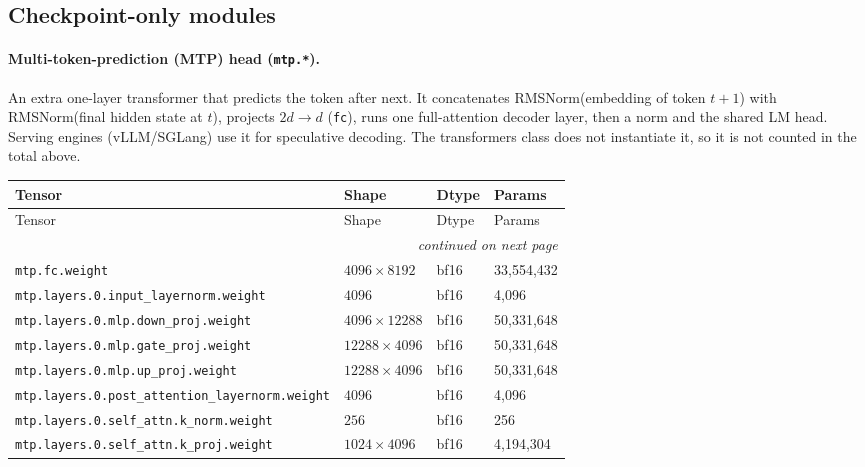 \documentclass[10pt,a4paper]{article}
\theoremstyle{definition}
\begin{document}
\subsection{Checkpoint-only modules}
\paragraph{Multi-token-prediction (MTP) head (\texttt{mtp.*}).} An extra one-layer transformer that predicts the token after next. It concatenates RMSNorm(embedding of token $t{+}1$) with RMSNorm(final hidden state at $t$), projects $2d\to d$ (\texttt{fc}), runs one full-attention decoder layer, then a norm and the shared LM head. Serving engines (vLLM/SGLang) use it for speculative decoding. The transformers class does not instantiate it, so it is not counted in the total above.
\begin{longtable}{p{8.5cm}lll}
\toprule
Tensor & Shape & Dtype & Params \\
\midrule
\endfirsthead
\toprule
Tensor & Shape & Dtype & Params \\
\midrule
\endhead
\midrule \multicolumn{4}{r}{\textit{continued on next page}} \\
\endfoot
\bottomrule
\endlastfoot
\texttt{mtp.\allowbreak{}fc.\allowbreak{}weight} & $4096 \times 8192$ & bf16 & 33,554,432 \\
\texttt{mtp.\allowbreak{}layers.\allowbreak{}0.\allowbreak{}input\_layernorm.\allowbreak{}weight} & $4096$ & bf16 & 4,096 \\
\texttt{mtp.\allowbreak{}layers.\allowbreak{}0.\allowbreak{}mlp.\allowbreak{}down\_proj.\allowbreak{}weight} & $4096 \times 12288$ & bf16 & 50,331,648 \\
\texttt{mtp.\allowbreak{}layers.\allowbreak{}0.\allowbreak{}mlp.\allowbreak{}gate\_proj.\allowbreak{}weight} & $12288 \times 4096$ & bf16 & 50,331,648 \\
\texttt{mtp.\allowbreak{}layers.\allowbreak{}0.\allowbreak{}mlp.\allowbreak{}up\_proj.\allowbreak{}weight} & $12288 \times 4096$ & bf16 & 50,331,648 \\
\texttt{mtp.\allowbreak{}layers.\allowbreak{}0.\allowbreak{}post\_attention\_layernorm.\allowbreak{}weight} & $4096$ & bf16 & 4,096 \\
\texttt{mtp.\allowbreak{}layers.\allowbreak{}0.\allowbreak{}self\_attn.\allowbreak{}k\_norm.\allowbreak{}weight} & $256$ & bf16 & 256 \\
\texttt{mtp.\allowbreak{}layers.\allowbreak{}0.\allowbreak{}self\_attn.\allowbreak{}k\_proj.\allowbreak{}weight} & $1024 \times 4096$ & bf16 & 4,194,304 \\

\end{longtable}
\end{document}
